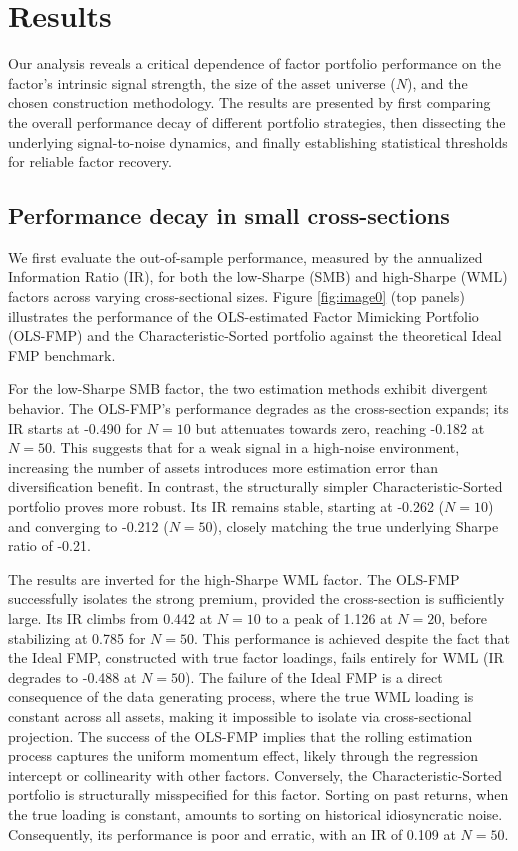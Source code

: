 \documentclass[]{article}
\begin{document}
\section{Results}
\label{sec:results}
Our analysis reveals a critical dependence of factor portfolio performance on the factor's intrinsic signal strength, the size of the asset universe ($N$), and the chosen construction methodology. The results are presented by first comparing the overall performance decay of different portfolio strategies, then dissecting the underlying signal-to-noise dynamics, and finally establishing statistical thresholds for reliable factor recovery.

\subsection{Performance decay in small cross-sections}

We first evaluate the out-of-sample performance, measured by the annualized Information Ratio (IR), for both the low-Sharpe (SMB) and high-Sharpe (WML) factors across varying cross-sectional sizes. Figure \ref{fig:image0} (top panels) illustrates the performance of the OLS-estimated Factor Mimicking Portfolio (OLS-FMP) and the Characteristic-Sorted portfolio against the theoretical Ideal FMP benchmark.

For the low-Sharpe SMB factor, the two estimation methods exhibit divergent behavior. The OLS-FMP's performance degrades as the cross-section expands; its IR starts at -0.490 for $N=10$ but attenuates towards zero, reaching -0.182 at $N=50$. This suggests that for a weak signal in a high-noise environment, increasing the number of assets introduces more estimation error than diversification benefit. In contrast, the structurally simpler Characteristic-Sorted portfolio proves more robust. Its IR remains stable, starting at -0.262 ($N=10$) and converging to -0.212 ($N=50$), closely matching the true underlying Sharpe ratio of -0.21.

The results are inverted for the high-Sharpe WML factor. The OLS-FMP successfully isolates the strong premium, provided the cross-section is sufficiently large. Its IR climbs from 0.442 at $N=10$ to a peak of 1.126 at $N=20$, before stabilizing at 0.785 for $N=50$. This performance is achieved despite the fact that the Ideal FMP, constructed with true factor loadings, fails entirely for WML (IR degrades to -0.488 at $N=50$). The failure of the Ideal FMP is a direct consequence of the data generating process, where the true WML loading is constant across all assets, making it impossible to isolate via cross-sectional projection. The success of the OLS-FMP implies that the rolling estimation process captures the uniform momentum effect, likely through the regression intercept or collinearity with other factors. Conversely, the Characteristic-Sorted portfolio is structurally misspecified for this factor. Sorting on past returns, when the true loading is constant, amounts to sorting on historical idiosyncratic noise. Consequently, its performance is poor and erratic, with an IR of 0.109 at $N=50$.
\end{document}
